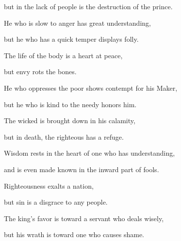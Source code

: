 {\par }{\QB but in the lack of people is the destruction of the prince.
\par }{\Q {}He who is slow to anger has great understanding,
\par }{\QB but he who has a quick temper displays folly.
\par }{\Q {}The life of the body is a heart at peace,
\par }{\QB but envy rots the bones.
\par }{\Q {}He who oppresses the poor shows contempt for his Maker,
\par }{\QB but he who is kind to the needy honors him.
\par }{\Q {}The wicked is brought down in his calamity,
\par }{\QB but in death, the righteous has a refuge.
\par }{\Q {}Wisdom rests in the heart of one who has understanding,
\par }{\QB and is even made known in the inward part of fools.
\par }{\Q {}Righteousness exalts a nation,
\par }{\QB but sin is a disgrace to any people.
\par }{\Q {}The king’s favor is toward a servant who deals wisely,
\par }{\QB but his wrath is toward one who causes shame.

}
